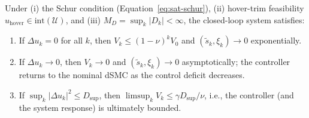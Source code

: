 \documentclass[conf]{new-aiaa}
\begin{document}
Under (i) the Schur condition (Equation~\ref{eq:sat-schur}), (ii) hover-trim feasibility $u_{\mathrm{hover}} \in \mathrm{int}(\mathcal{U})$, and (iii) $M_D = \sup_k |D_k| < \infty$, the closed-loop system satisfies:
\begin{enumerate}
\item If $\Delta u_k = 0$ for all $k$, then $V_k \leq (1 - \nu)^k V_0$ and $(\tilde s_k, \xi_k) \to 0$ exponentially.
\item If $\Delta u_k \to 0$, then $V_k \to 0$ and $(\tilde s_k, \xi_k) \to 0$ asymptotically; the controller returns to the nominal dSMC as the control deficit decreases. 
\item If $\sup_k |\Delta u_k|^2 \leq D_{\sup}$, then $\limsup_k V_k \leq \gamma D_{\sup}/\nu$, i.e., the controller (and the system response) is ultimately bounded.
\end{enumerate}
\end{document}
